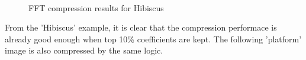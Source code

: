 \documentclass[12pt]{article}
\begin{document}
\begin{figure}[H]
    \centering
    \\
    \caption{FFT compression results for Hibiscus}
    \label{ref_label_overall}
\end{figure}
\begin{flushleft}
From the 'Hibiscus' example, it is clear that the compression performace is already good enough when top 10\% coefficients are kept.
The following 'platform' image is also compressed by the same logic.
\end{flushleft}
\end{document}
